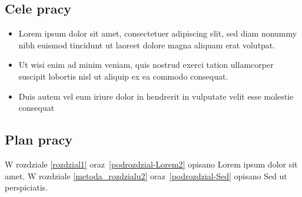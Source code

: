 
\subsection{Cele pracy}
\begin{itemize}
\item Lorem ipsum dolor sit amet, consectetuer adipiscing elit, sed diam nonummy nibh euismod tincidunt ut laoreet dolore magna aliquam erat volutpat. 
\item Ut wisi enim ad minim veniam, quis nostrud exerci tation ullamcorper suscipit lobortis nisl ut aliquip ex ea commodo consequat. 
\item Duis autem vel eum iriure dolor in hendrerit in vulputate velit esse molestie consequat
\end{itemize}

\clearpage
\subsection{Plan pracy}

W rozdziale \ref{rozdzial1} oraz~\ref{podrozdzial-Lorem2} opisano Lorem ipsum dolor sit amet. W rozdziale \ref{metoda_rozdzialu2} oraz~\ref{podrozdzial-Sed} opisano Sed ut perspiciatis.

